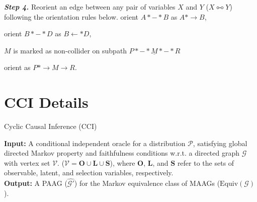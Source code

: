 \documentclass[twoside, 11pt]{article}
\begin{document}
\begin{appendices}
\begin{algorithm}
\begin{algorithmic}[1]
\State \textit{\textbf{Step 4.}}  \label{fcistep4} Reorient an edge between any pair of variables $X$ and $Y$ ($X \multimapboth Y$) following the orientation rules below. 
\Repeat
            \State orient $A * - * B$ as $A * \rightarrow B$,
        
            \State orient $B*-*D$ as $B \leftarrow * D$,
        
                 {$M$ is marked as non-collider on subpath $P *-* \underline{M} *-* R$}
                \EndIf
        
            \State orient as $P * \rightarrow M \rightarrow R$.
    \EndIf
{}

\end{algorithmic}
\end{algorithm}



\pagebreak
\section{CCI Details}\label{algCCI}


\begin{algorithm} 
\caption{Cyclic Causal Inference (CCI)}
 \hspace*{\algorithmicindent} \textbf{Input:} A conditional independent oracle for a distribution $\mathcal{P}$, satisfying global directed Markov property and faithfulness conditions w.r.t. a directed graph $\mathcal{G}$ with vertex set $\mathcal{V}$. ($\mathcal{V} = \mathbf{O} \cup \mathbf{L} \cup \mathbf{S}$), where $\mathbf{O}$, $\mathbf{L}$, and $\mathbf{S}$ refer to the sets of observable, latent, and selection variables, respectively.\\
 \hspace*{\algorithmicindent} \textbf{Output:} A PAAG ($\mathcal{\hat{G'}}$) for the Markov equivalence class of MAAGs ($\text{Equiv}(\mathcal{G})$).



\end{algorithm}
\end{appendices}
\end{document}
